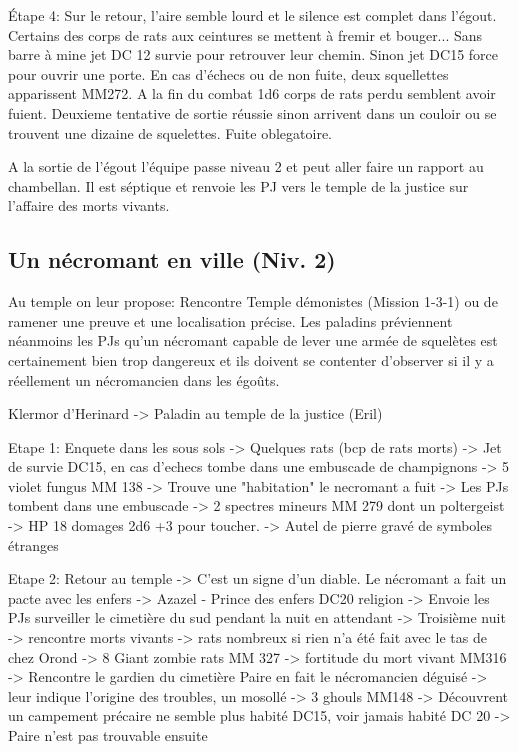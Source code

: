 Étape 4: Sur le retour, l'aire semble lourd et le silence est complet dans l'égout. Certains des corps 
de rats aux ceintures se mettent à fremir et bouger... Sans barre à mine
jet DC 12 survie pour retrouver leur chemin. Sinon jet DC15 force pour ouvrir une porte. En cas d'échecs
ou de non fuite, deux squellettes apparissent MM272. A la fin du combat 1d6 corps de rats perdu semblent 
avoir fuient. Deuxieme tentative de sortie réussie sinon arrivent dans un couloir ou se trouvent une dizaine
de squelettes. Fuite oblegatoire.

A la sortie de l'égout l'équipe passe niveau 2 et peut aller faire un rapport au chambellan. Il est
séptique et renvoie les PJ vers le temple de la justice sur l'affaire des morts vivants.

\subsection{Un nécromant en ville (Niv. 2)}

Au temple on leur propose: Rencontre Temple démonistes (Mission 1-3-1) ou de ramener une preuve et une 
localisation précise. Les paladins préviennent néanmoins les PJs qu'un nécromant capable de lever une
armée de squelètes est certainement bien trop dangereux et ils doivent se contenter d'observer si il
y a réellement un nécromancien dans les égoûts.

Klermor d'Herinard -> Paladin au temple de la justice (Eril)

Etape 1: Enquete dans les sous sols 
 -> Quelques rats (bcp de rats morts)
 -> Jet de survie DC15, en cas d'echecs tombe dans une embuscade de champignons -> 5 violet fungus MM 138
 -> Trouve une "habitation" le necromant a fuit
 -> Les PJs tombent dans une embuscade -> 2 spectres mineurs MM 279 dont un poltergeist -> HP 18 domages 2d6 +3 pour toucher.
 -> Autel de pierre gravé de symboles étranges

Etape 2: Retour au temple
 -> C'est un signe d'un diable. Le nécromant a fait un pacte avec les enfers -> Azazel - Prince des enfers DC20 religion
 -> Envoie les PJs surveiller le cimetière du sud pendant la nuit en attendant
 -> Troisième nuit -> rencontre morts vivants -> rats nombreux si rien n'a été fait avec le tas de chez Orond -> 8 Giant zombie rats MM 327 -> fortitude du mort vivant MM316
 -> Rencontre le gardien du cimetière Paire en fait le nécromancien déguisé -> leur indique l'origine des troubles, un mosollé -> 3 ghouls MM148
 -> Découvrent un campement précaire ne semble plus habité DC15, voir jamais habité DC 20 -> Paire n'est pas trouvable ensuite

